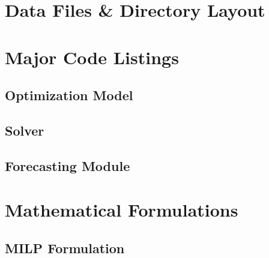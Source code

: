\appendix

\section{Data Files \& Directory Layout}

\section{Major Code Listings}

\subsection{Optimization Model}


\subsection{Solver}


\subsection{Forecasting Module}
% 

\section{Mathematical Formulations}

\subsection{MILP Formulation}

